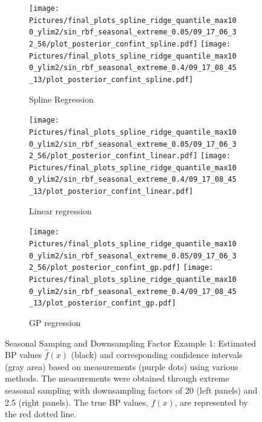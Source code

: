 \begin{figure}
\begin{subfigure}{\textwidth}
    \centering
    \texttt{[image: 
    Pictures/final\_plots\_spline\_ridge\_quantile\_max100\_ylim2/sin\_rbf\_seasonal\_extreme\_0.05/09\_17\_06\_32\_56/plot\_posterior\_confint\_spline.pdf]}
    \texttt{[image: 
    Pictures/final\_plots\_spline\_ridge\_quantile\_max100\_ylim2/sin\_rbf\_seasonal\_extreme\_0.4/09\_17\_08\_45\_13/plot\_posterior\_confint\_spline.pdf]}
  \caption{Spline Regression}
\end{subfigure}

\begin{subfigure}{\textwidth}
    \centering
    \texttt{[image: 
    Pictures/final\_plots\_spline\_ridge\_quantile\_max100\_ylim2/sin\_rbf\_seasonal\_extreme\_0.05/09\_17\_06\_32\_56/plot\_posterior\_confint\_linear.pdf]}
    \texttt{[image: 
        Pictures/final\_plots\_spline\_ridge\_quantile\_max100\_ylim2/sin\_rbf\_seasonal\_extreme\_0.4/09\_17\_08\_45\_13/plot\_posterior\_confint\_linear.pdf]}
  \caption{Linear regression }
\end{subfigure}

\begin{subfigure}{\textwidth}
    \centering
    \texttt{[image: 
    Pictures/final\_plots\_spline\_ridge\_quantile\_max100\_ylim2/sin\_rbf\_seasonal\_extreme\_0.05/09\_17\_06\_32\_56/plot\_posterior\_confint\_gp.pdf]}
    \texttt{[image: 
       Pictures/final\_plots\_spline\_ridge\_quantile\_max100\_ylim2/sin\_rbf\_seasonal\_extreme\_0.4/09\_17\_08\_45\_13/plot\_posterior\_confint\_gp.pdf]}
  \caption{GP regression}
\end{subfigure}\hfill

\caption[Seasonal Samping and Downsampling Factor Example 1]{Seasonal Samping and Downsampling Factor Example 1:
    Estimated BP values $\hat{f}(x)$ (black) and corresponding confidence intervals (gray area)
    based on measurements (purple dots) using various methods.
    The measurements were obtained through extreme seasonal sampling with downsampling
    factors of 20 (left panels) and 2.5 (right panels).
    The true BP values, $f(x)$, are represented by the red dotted line.}
\label{fig:ex-seasonal-sampling}
\end{figure}


